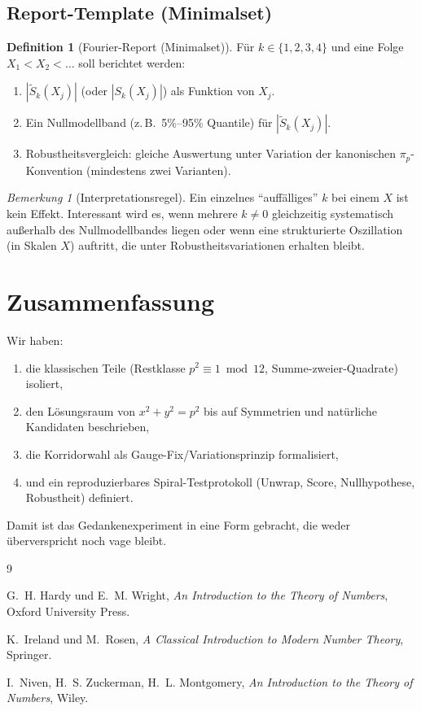 \documentclass[a4paper,11pt]{article}
\theoremstyle{definition}
\newtheorem{definition}[satz]{Definition}
\theoremstyle{remark}
\newtheorem{bemerkung}[satz]{Bemerkung}
\begin{document}
	\subsection{Report-Template (Minimalset)}
	\begin{definition}[Fourier-Report (Minimalset)]
		Für \(k\in\{1,2,3,4\}\) und eine Folge \(X_1<X_2<\dots\) soll berichtet werden:
		\begin{enumerate}
			\item \(|\widetilde S_k(X_j)|\) (oder \(|S_k(X_j)|\)) als Funktion von \(X_j\).
			\item Ein Nullmodellband (z.\,B.\ 5\%–95\% Quantile) für \(|\widetilde S_k(X_j)|\).
			\item Robustheitsvergleich: gleiche Auswertung unter Variation der kanonischen \(\pi_p\)-Konvention (mindestens zwei Varianten).
		\end{enumerate}
	\end{definition}
	
	\begin{bemerkung}[Interpretationsregel]
		Ein einzelnes ``auffälliges'' \(k\) bei einem \(X\) ist kein Effekt. Interessant wird es, wenn mehrere \(k\neq 0\)
		gleichzeitig systematisch außerhalb des Nullmodellbandes liegen oder wenn eine strukturierte Oszillation
		(in Skalen \(X\)) auftritt, die unter Robustheitsvariationen erhalten bleibt.
	\end{bemerkung}
	
	\section{Zusammenfassung}
	Wir haben:
	\begin{enumerate}
		\item die klassischen Teile (Restklasse \(p^2\equiv 1\bmod 12\), Summe-zweier-Quadrate) isoliert,
		\item den Lösungsraum von \(x^2+y^2=p^2\) bis auf Symmetrien und natürliche Kandidaten beschrieben,
		\item die Korridorwahl als Gauge-Fix/Variationsprinzip formalisiert,
		\item und ein reproduzierbares Spiral-Testprotokoll (Unwrap, Score, Nullhypothese, Robustheit) definiert.
	\end{enumerate}
	Damit ist das Gedankenexperiment in eine Form gebracht, die weder überverspricht noch vage bleibt.
	
	\begin{thebibliography}{9}
		
		G.~H. Hardy und E.~M. Wright,
		\textit{An Introduction to the Theory of Numbers},
		Oxford University Press.
		
		K.~Ireland und M.~Rosen,
		\textit{A Classical Introduction to Modern Number Theory},
		Springer.
		
		I.~Niven, H.~S. Zuckerman, H.~L. Montgomery,
		\textit{An Introduction to the Theory of Numbers},
		Wiley.
		
	\end{thebibliography}
	
\end{document}
